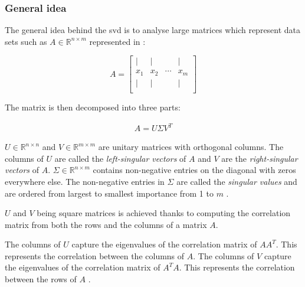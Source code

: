 



\subsubsection{General idea}

The general idea behind the \gls{svd} is to analyse large matrices which represent data sets such as  $A \in \mathbb{R}^{n \times m}$ represented in :

\begin{equation}
	\label{formula:svdMatrixShape}
	A = 
	\begin{bmatrix}
		\mid & \mid & & \mid\\
		x_1 & x_2 & \cdots & x_m\\
		\mid & \mid & & \mid\\
	\end{bmatrix}
\end{equation}

\vspace*{4mm}

The matrix is then decomposed into three parts:

\vspace{-6mm}
\begin{align}
	\label{formula:svdBasic}
	A = U \Sigma V^T
\end{align}

$U \in \mathbb{R}^{n \times n}$ and $V \in \mathbb{R}^{m \times m}$ are unitary matrices with orthogonal columns.
The columns of $U$ are called the \emph{left-singular vectors} of $A$ and $V$ are the \emph{right-singular vectors} of $A$.
$\Sigma \in \mathbb{R}^{n \times m}$ contains non-negative entries on the diagonal with zeros everywhere else.
The non-negative entries in $\Sigma$ are called the \emph{singular values} and are ordered from largest to smallest importance from 1 to $m$ \cite{brunton2019data}.
\bigskip


$U$ and $V$ being square matrices is achieved thanks to computing the correlation matrix from both the rows and the columns of a matrix $A$.

The columns of $U$ capture the eigenvalues of the correlation matrix of $AA^T$.
This represents the correlation between the columns of $A$.
The columns of $V$ capture the eigenvalues of the correlation matrix of $A^TA$.
This represents the correlation between the rows of $A$ \cite{brunton2019data}.  %
\bigskip


